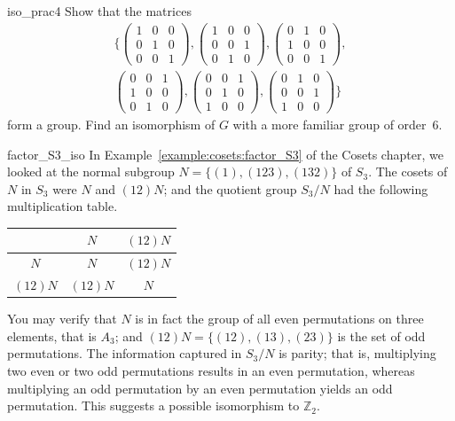 \begin{exercise}{iso_prac4}
Show that the matrices
\begin{gather*}
\Big\{
\begin{pmatrix}
1 & 0 & 0 \\
0 & 1 & 0 \\
0 & 0 & 1
\end{pmatrix},
\begin{pmatrix}
1 & 0 & 0 \\
0 & 0 & 1 \\
0 & 1 & 0
\end{pmatrix},
\begin{pmatrix}
0 & 1 & 0 \\
1 & 0 & 0 \\
0 & 0 & 1
\end{pmatrix}, \\
\begin{pmatrix}
0 & 0 & 1 \\
1 & 0 & 0 \\
0 & 1 & 0
\end{pmatrix},
\begin{pmatrix}
0 & 0 & 1 \\
0 & 1 & 0 \\
1 & 0 & 0
\end{pmatrix},
\begin{pmatrix}
0 & 1 & 0 \\
0 & 0 & 1 \\
1 & 0 & 0
\end{pmatrix}
\Big\}
\end{gather*}
form a group. Find an isomorphism of $G$ with a more familiar group of
order~6.
\end{exercise} 

\begin{example}{factor_S3_iso}
In Example~\ref{example:cosets:factor_S3} of the Cosets chapter, we looked at  the normal subgroup  $N = \{ (1), (123), (132)  \}$ of $S_3$.
The cosets of $N$ in $S_3$ were $N$ and $(12) N$; and the quotient group $S_3
/ N$ had the following multiplication table.
\begin{center}
\begin{tabular}{c|cc}
         & $N$      & $(12) N$ \\
\hline
$N$      & $N$      & $(12) N$ \\
$(12) N$ & $(12) N$ & $N$
\end{tabular}
\end{center}

You may verify that  $N$ is in fact the group of all even permutations on three elements, that is $A_3$; and $(12) N = \{ (12), (13), (23) \}$ is the set of odd
permutations. The information captured in $S_3/N$ is parity; that is,
multiplying two even or two odd permutations results in an even
permutation, whereas multiplying an odd permutation by an even
permutation yields an odd permutation. This suggests a possible isomorphism to ${\mathbb Z}_2$.
\end{example}

